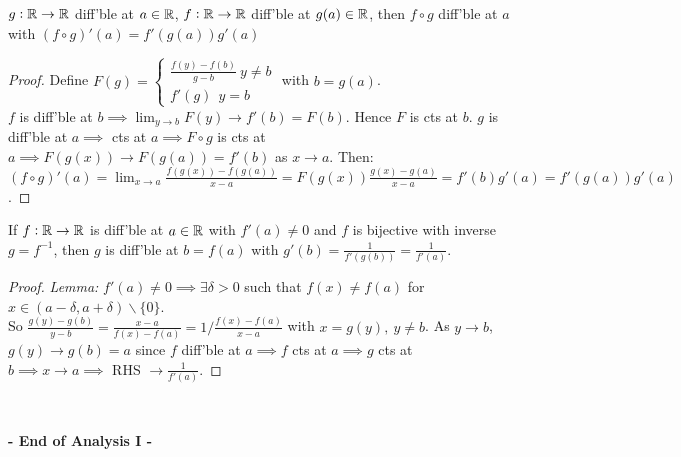 \begin{theorem} $g: \mathbb{R} \to \mathbb{R}$ diff'ble at $a \in \mathbb{R}$, $f: \mathbb{R} \to \mathbb{R}$ diff'ble at $g(a) \in \mathbb{R}$, then $f \circ g$ diff'ble at $a$ with $(f\circ g)'(a) =f'(g(a))g'(a)$
\end{theorem}
\begin{proof}
Define $F(g) = \begin{cases}
 	\frac{f(y)-f(b)}{g-b} ~y \neq b\\
 	f'(g) ~~ y = b
 \end{cases}$
 with $b = g(a)$. \vspace*{5pt}\\$f$ is diff'ble at $b \implies \lim_{y \to b} F(y) \to f'(b) = F(b)$. Hence $F$ is cts at $b$. $g$ is diff'ble at $a \implies$ cts at $a \implies F \circ g$ is cts at $a \implies F(g(x)) \to F(g(a)) = f'(b)$ as $x \to a$. Then\vspace*{5pt}:\\
 $(f \circ g)'(a) = \lim_{x \to a} \frac{f(g(x)) - f(g(a))}{x-a} = F(g(x))\frac{g(x) - g(a)}{x-a} = f'(b)g'(a) = f'(g(a))g'(a)$.
\end{proof}\vspace*{5pt}

\begin{theorem}
	If $f:\mathbb{R} \to \mathbb{R}$ is diff'ble at $a\in \mathbb{R}$ with $f'(a) \neq 0$ and $f$ is bijective with inverse $g = f^{-1}$, then $g$ is diff'ble at $b = f(a)$ with $g'(b) = \frac{1}{f'(g(b))} = \frac{1}{f'(a)}.$
\end{theorem}
\begin{proof}
\textit{Lemma:} $f'(a) \neq 0 \implies \exists \delta > 0$ such that $f(x) \neq f(a)$ for $x \in (a-\delta,a + \delta)\backslash\{0\}$.  \\

\noindent So $\frac{g(y)-g(b)}{y-b} = \frac{x-a}{f(x) - f(a)} = 1/\frac{f(x)-f(a)}{x-a}$ with $x = g(y),~y \neq b$. As $y \to b$, $g(y) \to g(b) = a$ since $f$ diff'ble at $a \implies f$ cts at $a \implies g$ cts at $b \implies x \to a \implies$ RHS $\to \frac{1}{f'(a)}$.	
\end{proof}~\\



  \begin{center}
  \textsf{\textbf{- End of Analysis I -}}	
  \end{center}
  
\setcounter{lecture}{1}
  
  
  